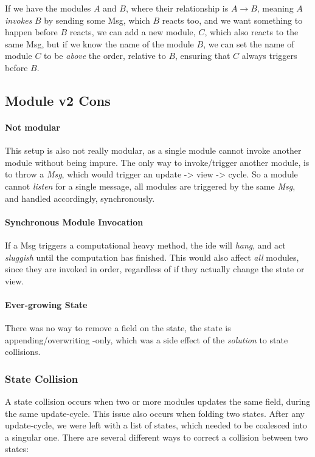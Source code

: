 If we have the modules $A$ and $B$, where their relationship is $A \to B$,
meaning $A$ \textit{invokes} $B$ by sending some Msg, which $B$ reacts too, and
we want something to happen before $B$ reacts, we can add a new module, $C$,
which also reacts to the same Msg, but if we know the name of the module $B$,
we can set the name of module $C$ to be \textit{above} the order, relative to
$B$, ensuring that $C$ always triggers before $B$.

\subsection{Module v2 Cons}

\paragraph{Not modular} This setup is also not really modular, as a single
module cannot invoke another module without being impure. The only way to
invoke/trigger another module, is to throw a \textit{Msg}, which would trigger
an update -> view -> cycle. So a module cannot \textit{listen} for a single
message, all modules are triggered by the same \textit{Msg}, and handled
accordingly, synchronously.

\paragraph{Synchronous Module Invocation} If a Msg triggers a computational
heavy method, the \gls{ide} will \textit{hang}, and act \textit{sluggish} until
the computation has finished. This would also affect \textit{all} modules,
since they are invoked in order, regardless of if they actually change the
state or view.

\paragraph{Ever-growing State} There was no way to remove a field on the state,
the state is appending/overwriting -only, which was a side effect of the
\textit{solution} to state collisions.

\subsubsection{State Collision} \label{sec:collision}

A state collision occurs when two or more modules updates the same field, during
the same update-cycle. This issue also occurs when folding two states. After any
update-cycle, we were left with a list of states, which needed to be coalesced
into a singular one. There are several different ways to correct a collision
between two states:

